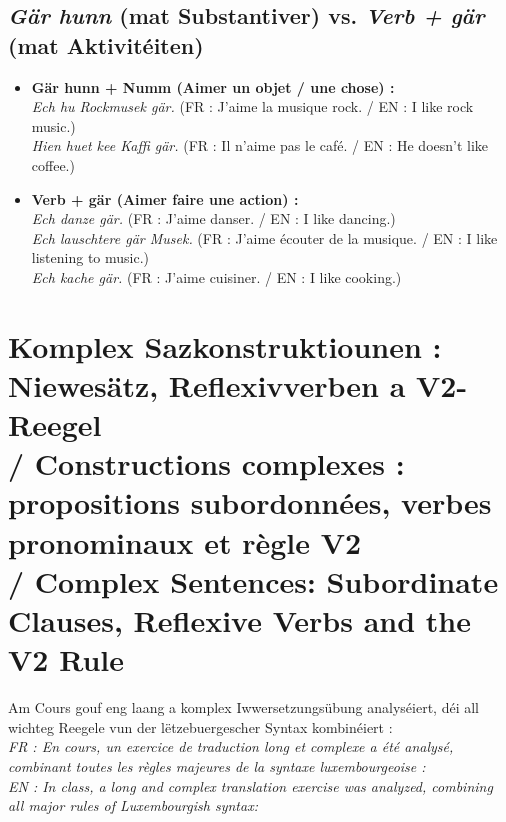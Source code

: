 \subsection{\textit{Gär hunn} (mat Substantiver) vs. \textit{Verb + gär} (mat Aktivitéiten)}
\begin{itemize}
    \item \textbf{Gär hunn + Numm (Aimer un objet / une chose) :} \\
    \textit{Ech hu Rockmusek gär.} (FR : J'aime la musique rock. / EN : I like rock music.) \\
    \textit{Hien huet kee Kaffi gär.} (FR : Il n'aime pas le café. / EN : He doesn't like coffee.)
    \item \textbf{Verb + gär (Aimer faire une action) :} \\
    \textit{Ech danze gär.} (FR : J'aime danser. / EN : I like dancing.) \\
    \textit{Ech lauschtere gär Musek.} (FR : J'aime écouter de la musique. / EN : I like listening to music.) \\
    \textit{Ech kache gär.} (FR : J'aime cuisiner. / EN : I like cooking.)
\end{itemize}

\vspace{1.5em}

\section[Komplex Sazkonstruktiounen: Niewesätz, Reflexivverben a V2-Reegel]{Komplex Sazkonstruktiounen : Niewesätz, Reflexivverben a V2-Reegel \\/ Constructions complexes : propositions subordonnées, verbes pronominaux et règle V2 \\/ Complex Sentences: Subordinate Clauses, Reflexive Verbs and the V2 Rule}

Am Cours gouf eng laang a komplex Iwwersetzungsübung analyséiert, déi all wichteg Reegele vun der lëtzebuergescher Syntax kombinéiert : \\
\textit{FR : En cours, un exercice de traduction long et complexe a été analysé, combinant toutes les règles majeures de la syntaxe luxembourgeoise :} \\
\textit{EN : In class, a long and complex translation exercise was analyzed, combining all major rules of Luxembourgish syntax:}

